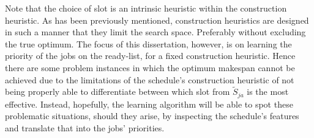 \begin{comment} %
Preliminary experiments which at each time step all jobs on the ready-list are explored and dispatched according to a (fixed) construction heuristic. The job corresponding to the best resulting makespan (found via analytical methods) is chosen to have the highest priority. The resulting makespan is divided by its theoretical optimal makespan, i.e., the deviation from optimality defined by \cref{eq:ratio}. A histogram for 6-job 5-machine \jsp\ problem instances ($N=500$) is depicted in \cref{fig:slot:smallestvsfirst} using both the intrinsic heuristics: (\subref{fig:slot:first}) first slot chosen and (\subref{fig:slot:small}) slot corresponding to the smallest slot size chosen. Using always the first slot, roughly 26\% of the instances were able to achieve the optimum makespan, however mere 16\% using the smallest slot size. Hence dispatching in the first slot was favoured and will be used throughout the study.
\begin{figure}
\subfloat[][First slot]{\texttt{[image: slotsize\_first.eps]}} %
\subfloat[][Smallest slot size]{\texttt{[image: slotsize\_small.eps]}} %
\caption{Histogram of deviation from optimality by sequentially dispatching optimal jobs using a fixed construction heuristic.}
\label{fig:slot:smallestvsfirst}
\end{figure}
\end{comment}

Note that the choice of slot is an intrinsic heuristic within the construction heuristic. As has been previously mentioned, construction heuristics are designed in such a manner that they limit the search space. Preferably without excluding the true optimum. The focus of this dissertation, however, is on learning the priority of the jobs on the ready-list, for a fixed construction heuristic. Hence there are some problem instances in which the optimum makespan cannot be achieved due to the limitations of the schedule's construction heuristic of not being properly able to differentiate between which slot from $\tilde{S}_{ja}$ is the most effective. Instead, hopefully, the learning algorithm will be able to spot these problematic situations, should they arise, by inspecting the schedule's features and translate that into the jobs' priorities.

